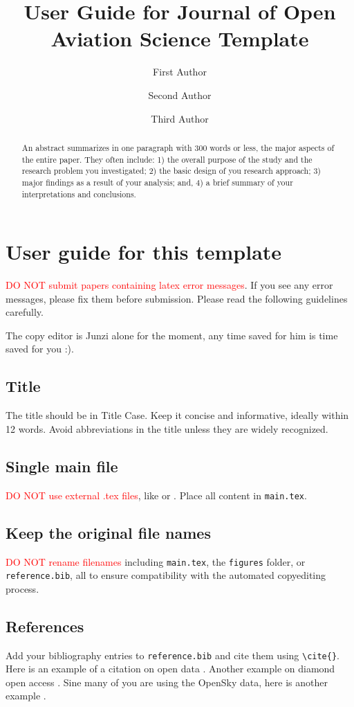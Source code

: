 \documentclass[
  manuscript=article,  %
  layout=preprint,  %
  year=20xx,
  volume=x,
]{extra/joas}
\title{User Guide for Journal of Open Aviation Science Template}
\author{First Author \orcid{0000-0000-0000-0000}}
\affiliation{Institution-1, City, Country}
\author{Second Author \orcid{0000-0000-0000-0000}}
\affiliation{Institution-2, City, Country}
\author{Third Author}
\affiliation{Institution-3, City, Country}
\begin{document}
\begin{abstract}
  An abstract summarizes in one paragraph with 300 words or less, the major aspects of the entire paper. They often include: 1) the overall purpose of the study and the research problem you investigated; 2) the basic design of you research approach; 3) major findings as a result of your analysis; and, 4) a brief summary of your interpretations and conclusions. 
\end{abstract}



\section{User guide for this template}

\textcolor{red}{DO NOT submit papers containing latex error messages}. If you see any error messages, please fix them before submission. Please read the following guidelines carefully.

The copy editor is Junzi alone for the moment, any time saved for him is time saved for you :).

\subsection{Title}
The title should be in Title Case. Keep it concise and informative, ideally within 12 words. Avoid abbreviations in the title unless they are widely recognized.

\subsection{Single main file}
\textcolor{red}{DO NOT use external .tex files}, like \verb|| or \verb||. Place all content in \texttt{main.tex}. 

\subsection{Keep the original file names}
\textcolor{red}{DO NOT rename filenames} including \texttt{main.tex}, the \texttt{figures} folder, or \texttt{reference.bib}, all to ensure compatibility with the automated copyediting process.

\subsection{References}
Add your bibliography entries to \texttt{reference.bib} and cite them using \verb|\cite{}|. Here is an example of a citation on open data \cite{murray2008open}. Another example on diamond open access \cite{fuchs2013diamond}. Sine many of you are using the OpenSky data, here is another example \cite{schafer2014bringing}.
\end{document}
